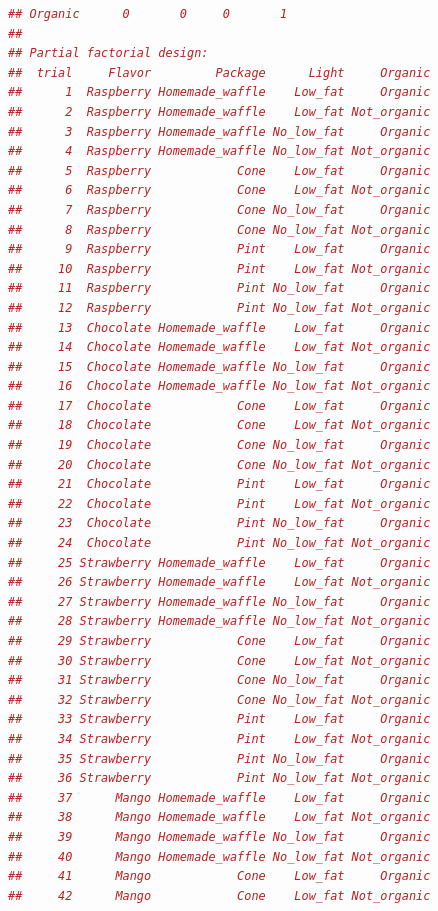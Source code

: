 \documentclass{article}
\begin{document}
\begin{lstlisting}[language=R]
## Organic      0       0     0       1
## 
## Partial factorial design:
##  trial     Flavor         Package      Light     Organic
##      1  Raspberry Homemade_waffle    Low_fat     Organic
##      2  Raspberry Homemade_waffle    Low_fat Not_organic
##      3  Raspberry Homemade_waffle No_low_fat     Organic
##      4  Raspberry Homemade_waffle No_low_fat Not_organic
##      5  Raspberry            Cone    Low_fat     Organic
##      6  Raspberry            Cone    Low_fat Not_organic
##      7  Raspberry            Cone No_low_fat     Organic
##      8  Raspberry            Cone No_low_fat Not_organic
##      9  Raspberry            Pint    Low_fat     Organic
##     10  Raspberry            Pint    Low_fat Not_organic
##     11  Raspberry            Pint No_low_fat     Organic
##     12  Raspberry            Pint No_low_fat Not_organic
##     13  Chocolate Homemade_waffle    Low_fat     Organic
##     14  Chocolate Homemade_waffle    Low_fat Not_organic
##     15  Chocolate Homemade_waffle No_low_fat     Organic
##     16  Chocolate Homemade_waffle No_low_fat Not_organic
##     17  Chocolate            Cone    Low_fat     Organic
##     18  Chocolate            Cone    Low_fat Not_organic
##     19  Chocolate            Cone No_low_fat     Organic
##     20  Chocolate            Cone No_low_fat Not_organic
##     21  Chocolate            Pint    Low_fat     Organic
##     22  Chocolate            Pint    Low_fat Not_organic
##     23  Chocolate            Pint No_low_fat     Organic
##     24  Chocolate            Pint No_low_fat Not_organic
##     25 Strawberry Homemade_waffle    Low_fat     Organic
##     26 Strawberry Homemade_waffle    Low_fat Not_organic
##     27 Strawberry Homemade_waffle No_low_fat     Organic
##     28 Strawberry Homemade_waffle No_low_fat Not_organic
##     29 Strawberry            Cone    Low_fat     Organic
##     30 Strawberry            Cone    Low_fat Not_organic
##     31 Strawberry            Cone No_low_fat     Organic
##     32 Strawberry            Cone No_low_fat Not_organic
##     33 Strawberry            Pint    Low_fat     Organic
##     34 Strawberry            Pint    Low_fat Not_organic
##     35 Strawberry            Pint No_low_fat     Organic
##     36 Strawberry            Pint No_low_fat Not_organic
##     37      Mango Homemade_waffle    Low_fat     Organic
##     38      Mango Homemade_waffle    Low_fat Not_organic
##     39      Mango Homemade_waffle No_low_fat     Organic
##     40      Mango Homemade_waffle No_low_fat Not_organic
##     41      Mango            Cone    Low_fat     Organic
##     42      Mango            Cone    Low_fat Not_organic

\end{lstlisting}
\end{document}
